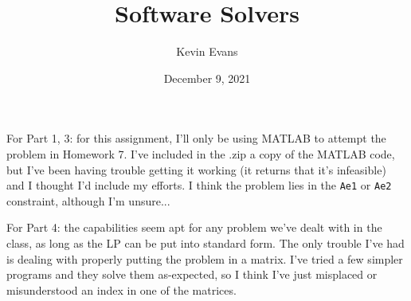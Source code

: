 \documentclass{homework}
\title{Software Solvers}
\author{Kevin Evans}
\date{December 9, 2021}
\begin{document}
	\maketitle
	For Part 1, 3: for this assignment, I'll only be using MATLAB to attempt the problem in Homework 7. I've included in the .zip a copy of the MATLAB code, but I've been having trouble getting it working (it returns that it's infeasible) and I thought I'd include my efforts. I think the problem lies in the \texttt{Ae1} or \texttt{Ae2} constraint, although I'm unsure...
	
	For Part 4: the capabilities seem apt for any problem we've dealt with in the class, as long as the LP can be put into standard form. The only trouble I've had is dealing with properly putting the problem in a matrix. I've tried a few simpler programs and they solve them as-expected, so I think I've just misplaced or misunderstood an index in one of the matrices.
\end{document}
